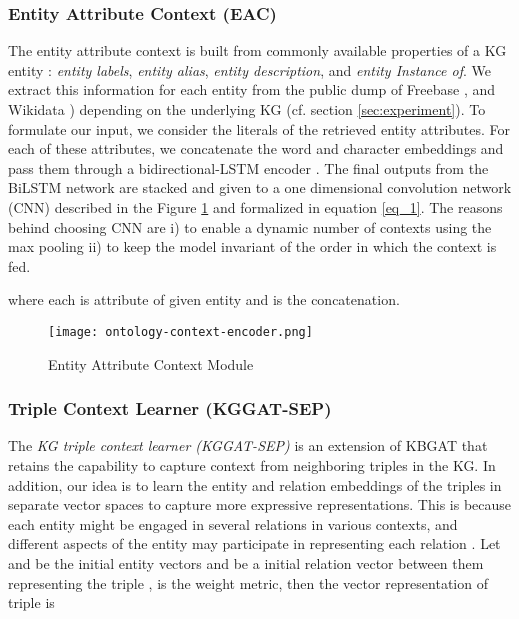 \documentclass[sigconf]{acmart}
\begin{document}
\subsubsection{ Entity Attribute Context (EAC)} \label{sec:eac}
The entity attribute context is built from commonly available properties of a KG entity \cite{hogan2020knowledge}:  \textit{entity labels}, \textit{entity alias}, \textit{entity description}, and \textit{entity Instance of}. We extract this information for each entity from the public dump of Freebase \cite{DBLP:conf/aaai/BollackerCT07}, and Wikidata \cite{DBLP:conf/www/Vrandecic12}) depending on the underlying KG (cf. section \ref{sec:experiment}). To formulate our input, we consider the literals of the retrieved entity attributes. For each of these attributes, we concatenate the word and character embeddings and pass them through a bidirectional-LSTM encoder \cite{schuster1997bidirectional}. The final outputs from the BiLSTM network are stacked and given to a one dimensional convolution network (CNN) described in the Figure \ref{fig:entity-attribute} and formalized in equation \ref{eq_1}. The reasons behind choosing CNN are i) to enable a dynamic number of contexts using the max pooling ii) to keep the model invariant of the order in which the context is fed.

where each  is attribute of given entity and  is the concatenation.
\begin{figure}[h!]
  \texttt{[image: ontology-context-encoder.png]}
  \caption{Entity Attribute Context Module}
  \label{fig:entity-attribute}
\end{figure}
\subsubsection{Triple Context Learner (KGGAT-SEP)} \label{sec:triple}
The \textit{KG triple context learner (KGGAT-SEP)} is an extension of KBGAT \cite{DBLP:conf/acl/NathaniCSK19} that retains the capability to capture context from neighboring triples in the KG. In addition, our idea is to learn the entity and relation embeddings of the triples in separate vector spaces to capture more expressive representations.
This is because each entity might be engaged in several relations in various contexts, and different aspects of the entity may participate in representing each relation \cite{DBLP:conf/aaai/LinLSLZ15}.
Let  and  be the initial entity vectors and  
be a initial relation vector between them representing the triple , 
 is the weight metric, then the vector representation of triple is
\end{document}
